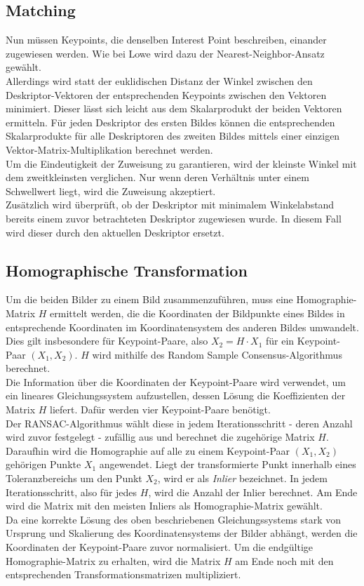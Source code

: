 \documentclass[deutsch]{scrartcl}
\begin{document}
\subsection{Matching} 
Nun müssen Keypoints, die denselben Interest Point beschreiben, einander zugewiesen werden. Wie bei Lowe\cite{lowe04} wird dazu der Nearest-Neighbor-Ansatz gewählt.\\
Allerdings wird statt der euklidischen Distanz der Winkel zwischen den Deskriptor-Vektoren der entsprechenden Keypoints zwischen den Vektoren minimiert. Dieser lässt sich leicht aus dem Skalarprodukt der beiden Vektoren ermitteln. Für jeden Deskriptor des ersten Bildes können die entsprechenden Skalarprodukte für alle Deskriptoren des zweiten Bildes mittels einer einzigen Vektor-Matrix-Multiplikation berechnet werden.\\
Um die Eindeutigkeit der Zuweisung zu garantieren, wird der kleinste Winkel mit dem zweitkleinsten verglichen\cite{lowe04}. Nur wenn deren Verhältnis unter einem Schwellwert liegt, wird die Zuweisung akzeptiert.\\
Zusätzlich wird überprüft, ob der Deskriptor mit minimalem Winkelabstand bereits einem zuvor betrachteten Deskriptor zugewiesen wurde. In diesem Fall wird dieser durch den aktuellen Deskriptor ersetzt.\\

\subsection{Homographische Transformation}
Um die beiden Bilder zu einem Bild zusammenzuführen, muss eine Homographie-Matrix $H$ ermittelt werden, die die Koordinaten der Bildpunkte eines Bildes in entsprechende Koordinaten im Koordinatensystem des anderen Bildes umwandelt. Dies gilt insbesondere für Keypoint-Paare, also $X_2=H\cdot X_1$ für ein Keypoint-Paar $(X_1,X_2)$. $H$ wird mithilfe des Random Sample Consensus-Algorithmus\cite{dubrovsky09} berechnet.\\
Die Information über die Koordinaten der Keypoint-Paare wird verwendet, um ein lineares Gleichungssystem aufzustellen, dessen Lösung die Koeffizienten der Matrix $H$ liefert. Dafür werden vier Keypoint-Paare benötigt.\cite{kriegman07}\\
Der RANSAC-Algorithmus wählt diese in jedem Iterationsschritt - deren Anzahl wird zuvor festgelegt - zufällig aus und berechnet die zugehörige Matrix $H$. Daraufhin wird die Homographie auf alle zu einem Keypoint-Paar $(X_1,X_2)$ gehörigen Punkte $X_1$ angewendet. Liegt der transformierte Punkt innerhalb eines Toleranzbereichs um den Punkt $X_2$, wird er als \textit{Inlier} bezeichnet. In jedem Iterationsschritt, also für jedes $H$, wird die Anzahl der Inlier berechnet. Am Ende wird die Matrix mit den meisten Inliers als Homographie-Matrix gewählt.\\
Da eine korrekte Lösung des oben beschriebenen Gleichungssystems stark von Ursprung und Skalierung des Koordinatensystems der Bilder abhängt, werden die Koordinaten der Keypoint-Paare zuvor normalisiert. Um die endgültige Homographie-Matrix zu erhalten, wird die Matrix $H$ am Ende noch mit den entsprechenden Transformationsmatrizen multipliziert.\cite{dubrovsky09}
\end{document}
